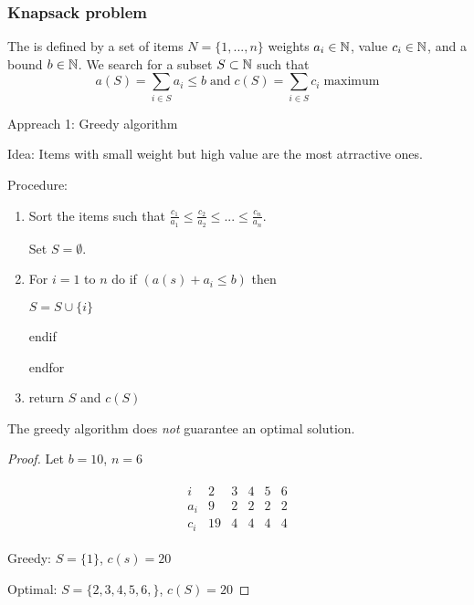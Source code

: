 \begin{lec}[2011-10-26]\end{lec}

\setcounter{section}{6}
\setcounter{subsection}{0}

\subsubsection*{Knapsack problem} 

\begin{defn} %
	The  is defined by a set of items $N = \{ 1, ... , n \}$ weights $a_i \in \mathbb{N}$, value $c_i \in \mathbb{N}$, and a bound $b\in \mathbb{N}$. We search for a subset $S\subset \mathbb{N}$ such that 
	\[
		a(S) = \sum_{i \in S} a_i \leq b \; \text{and} \; c(S) = \sum_{i\in S} c_i \; \text{maximum}
	\]
\end{defn}

Appreach 1: Greedy algorithm

Idea: Items with small weight but high value are the most atrractive ones.

Procedure:
\begin{enumerate}
	\item Sort the items such that $\frac{c_1}{a_1} \leq \frac{c_2}{a_2} \leq ... \leq \frac{c_n}{a_n}$.
	
	Set $S = \emptyset$.
	\item For $i = 1$ to $n$ do
		if $( a(s) + a_i \leq b) $ then
		
			$S = S \cup \{ i \}$
			
		endif
	
	endfor
	\item return $S$ and $c(S)$
\end{enumerate}

\begin{thm}
	The greedy algorithm does \emph{ not } guarantee an optimal solution.
\end{thm}

\begin{proof}
	Let $b=10$, $n = 6$
	
	\begin{align*}
		\begin{matrix}
			i   & 2 & 3 & 4 & 5 & 6 \\
			a_i & 9 & 2 & 2 & 2 & 2 \\
			c_i &19 & 4 & 4 & 4 & 4
		\end{matrix}
	\end{align*}
	
	Greedy: $S=\{1\}$, $c(s)=20$
	
	Optimal: $S=\{2,3,4,5,6,\}$, $c(S)=20$
\end{proof}

